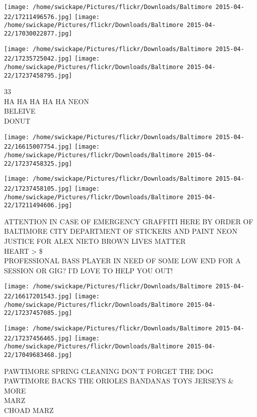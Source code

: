 \documentclass[10pt,letterpaper]{article}
\begin{document}
\texttt{[image: /home/swickape/Pictures/flickr/Downloads/Baltimore 2015-04-22/17211496576.jpg]}
\texttt{[image: /home/swickape/Pictures/flickr/Downloads/Baltimore 2015-04-22/17030022877.jpg]}

\texttt{[image: /home/swickape/Pictures/flickr/Downloads/Baltimore 2015-04-22/17235725042.jpg]}
\texttt{[image: /home/swickape/Pictures/flickr/Downloads/Baltimore 2015-04-22/17237458795.jpg]}

33\\
HA HA HA HA HA NEON\\
BELEIVE\\
DONUT\\
\pagebreak

\texttt{[image: /home/swickape/Pictures/flickr/Downloads/Baltimore 2015-04-22/16615007754.jpg]}
\texttt{[image: /home/swickape/Pictures/flickr/Downloads/Baltimore 2015-04-22/17237458325.jpg]}

\texttt{[image: /home/swickape/Pictures/flickr/Downloads/Baltimore 2015-04-22/17237458105.jpg]}
\texttt{[image: /home/swickape/Pictures/flickr/Downloads/Baltimore 2015-04-22/17211494606.jpg]}

ATTENTION IN CASE OF EMERGENCY GRAFFITI HERE BY ORDER OF BALTIMORE CITY DEPARTMENT OF STICKERS AND PAINT NEON\\
JUSTICE FOR ALEX NIETO BROWN LIVES MATTER\\
HEART > \$\\
PROFESSIONAL BASS PLAYER IN NEED OF SOME LOW END FOR A SESSION OR GIG?  I'D LOVE TO HELP YOU OUT!\\
\pagebreak

\texttt{[image: /home/swickape/Pictures/flickr/Downloads/Baltimore 2015-04-22/16617201543.jpg]}
\texttt{[image: /home/swickape/Pictures/flickr/Downloads/Baltimore 2015-04-22/17237457085.jpg]}

\texttt{[image: /home/swickape/Pictures/flickr/Downloads/Baltimore 2015-04-22/17237456465.jpg]}
\texttt{[image: /home/swickape/Pictures/flickr/Downloads/Baltimore 2015-04-22/17049683468.jpg]}

PAWTIMORE SPRING CLEANING DON'T FORGET THE DOG\\
PAWTIMORE BACKS THE ORIOLES BANDANAS TOYS JERSEYS \& MORE\\
MARZ\\
CHOAD MARZ\\
\pagebreak
\end{document}
